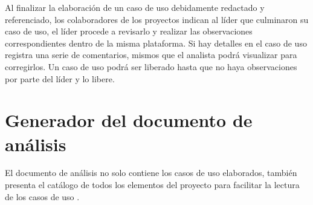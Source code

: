 Al finalizar la elaboración de un caso de uso debidamente redactado y referenciado, los colaboradores de los proyectos indican al líder que culminaron su caso de uso, el líder procede a revisarlo y realizar las observaciones correspondientes dentro de la misma plataforma. Si hay detalles en el caso de uso registra una serie de comentarios, mismos que el analista podrá visualizar para corregirlos. Un caso de uso podrá ser liberado hasta que no haya observaciones por parte del líder y lo libere.

\section{Generador del documento de análisis}

El documento de análisis no solo contiene los casos de uso elaborados, también presenta el catálogo de todos los elementos del proyecto para facilitar la lectura de los casos de uso .

